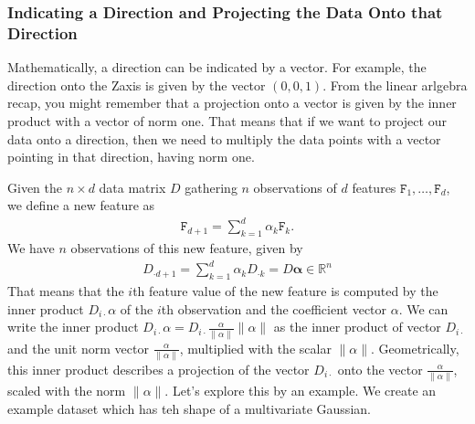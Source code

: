 \documentclass[letterpaper,10pt,english]{jupyterBook}
\begin{document}
\subsubsection{Indicating a Direction and Projecting the Data Onto that Direction}
\label{\detokenize{dim_reduction_pca:indicating-a-direction-and-projecting-the-data-onto-that-direction}}
\sphinxAtStartPar
Mathematically, a direction can be indicated by a vector. For example, the direction onto the Z\sphinxhyphen{}axis is given by the vector \((0,0,1)\). From the linear arlgebra recap, you might remember that a projection onto a vector is given by the inner product with a vector of norm one. That means that if we want to project our data onto a direction, then we need to multiply the data points with a vector pointing in that direction, having norm one.

\sphinxAtStartPar
Given the \(n\times d\) data matrix \(D\) gathering \(n\) observations of \(d\) features \(\mathtt{F}_1,\ldots,\mathtt{F}_d\), we define a new feature as
\label{equation:dim_reduction_pca:f227325a-a8b8-4778-bfa3-eb06423e3f7d}\begin{align}\mathtt{F}_{d+1}= \sum_{k=1}^d \alpha_k\mathtt{F}_k.\end{align}
\sphinxAtStartPar
We have \(n\) observations of this new feature, given by
\label{equation:dim_reduction_pca:ce31476f-9c16-40d5-9d0b-43d4d21f9729}\begin{align}D_{\cdot d+1} =\sum_{k=1}^d \alpha_kD_{\cdot k}=D\bm\alpha\in\mathbb{R}^n\end{align}
\sphinxAtStartPar
That means that the \(i\)\sphinxhyphen{}th feature value of the new feature is computed by the inner product \(D_{i\cdot}\alpha\) of the \(i\)\sphinxhyphen{}th observation and the coefficient vector \(\alpha\). We can write the inner product \(D_{i\cdot}\alpha = D_{i\cdot} \frac{\alpha}{\lVert\alpha\rVert}\lVert\alpha\rVert\) as the inner product of vector \(D_{i\cdot}\) and the unit norm vector \(\frac{\alpha}{\lVert\alpha\rVert}\), multiplied with the scalar \(\lVert\alpha\rVert\). Geometrically, this inner product describes a projection of the vector \(D_{i\cdot}\) onto the vector \(\frac{\alpha}{\lVert\alpha\rVert}\), scaled with the norm \(\lVert\alpha\rVert\). Let’s explore this by an example. We create an example dataset which has teh shape of a multivariate Gaussian.
\end{document}
